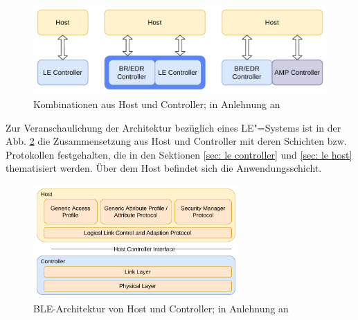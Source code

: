 \begin{figure}[H]
    \centering
    \includegraphics[width=0.9\linewidth]{graphics/kombination_host_controller.pdf}
    \caption[Kombinationen aus Host und Controller]{Kombinationen aus Host und Controller; in Anlehnung an \cite{BtSpec4.0_fig_124}}
    \label{fig: kombinationen aus host und controller}
\end{figure}
Zur Veranschaulichung der Architektur bezüglich eines LE"=Systems ist in der Abb. \ref{fig: host controller architektur} die Zusammensetzung aus Host und Controller mit deren Schichten bzw. Protokollen festgehalten, die in den Sektionen \ref{sec: le controller} und \ref{sec: le host} thematisiert werden. Über dem Host befindet sich die Anwendungsschicht.
\begin{figure}[H]
    \centering
    \includegraphics[width=0.7\textwidth]{graphics/host_controller_hci.pdf}
    \caption[BLE-Architektur von Host und Controller]{BLE-Architektur von Host und Controller; in Anlehnung an \cite{BtSpec4.0_fig_137}}
    \label{fig: host controller architektur}
\end{figure}